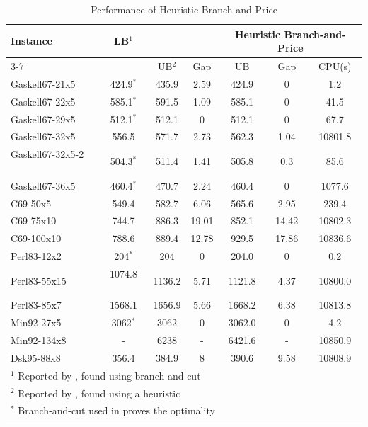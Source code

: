 \documentclass[graybox]{./styles/svmult}
\begin{document}
\begin{table}[ht]
\centering
\caption{Performance of  Heuristic Branch-and-Price}\label{brt-ub}
\begin {tabular}[t]{|l|c|c|c|c|c|c|}  
\hline
Instance & LB$^1$ & \multicolumn{2}{|c|}{\citet{Barreto07}} &  \multicolumn{3}{|c|}{Heuristic Branch-and-Price} \\\cline{3-7}
\mbox{} & \mbox{} & UB$^2$  & Gap & UB & Gap & CPU(s)\\\hline
Gaskell67-21x5	&	424.9$^*$	&	435.9	&	2.59	&	424.9	&	0	&	1.2	\\
Gaskell67-22x5 	&	585.1$^*$	&	591.5	&	1.09	&	585.1     &	0	&	41.5	\\
Gaskell67-29x5 	&	512.1$^*$	&	512.1	&	0	&	512.1	        &	0	&	67.7	\\
Gaskell67-32x5 	&	556.5	        &	571.7	&	2.73	&	562.3	&	1.04	&	10801.8	\\
Gaskell67-32x5-2 \ \ &	504.3$^*$	&	511.4	&	1.41	&       505.8	&	0.3	&	85.6	\\
Gaskell67-36x5 	&	460.4$^*$	&	470.7	&	2.24	&	460.4     &	0	&	1077.6	\\
C69-50x5 	&	549.4	        &	582.7	&	6.06	&	565.6	&	2.95	&	239.4	\\
C69-75x10 	&	744.7	        &	886.3	&	19.01	&	852.1	&	14.42	&	10802.3	\\
C69-100x10 	&	788.6	        &	889.4 &	12.78	&	929.5     	&	17.86	&	10836.6	\\
Perl83-12x2 	&	204$^*$	        &	204	&	0	&	204.0	        &	0	&	0.2	\\
Perl83-55x15 	&	1074.8 \ \	        &	1136.2	&	5.71	&	1121.8  &	4.37	&	10800.0	\\
Perl83-85x7 	&	1568.1	        &	1656.9 &	5.66	&	1668.2	        &	6.38	&	10813.8	\\
Min92-27x5 	&	3062$^*$	&	3062	&	0	&	3062.0	        &	0	&	4.2	\\
Min92-134x8 	&	  -	        &	6238 &	-	&	6421.6	        &	-	&	10850.9	\\
Dsk95-88x8 	&	356.4	        &	384.9 &	8	&	390.6	        &	9.58	&	10808.9	\\
\hline
\multicolumn{7}{l}{$^1$ Reported by \citet{Barreto04}, found using branch-and-cut}\\
\multicolumn{7}{l}{$^2$ Reported by \citet{Barreto07}, found using a heuristic}\\
\multicolumn{7}{l}{$^*$ Branch-and-cut used in \citet{Barreto04} proves the optimality}\\
\end{tabular}
\end{table}
\end{document}
